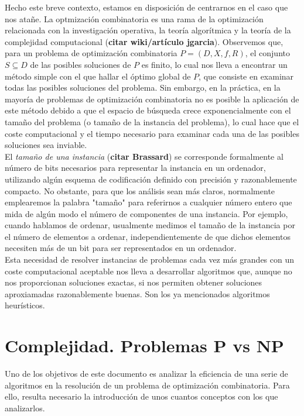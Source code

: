 \documentclass[a4paper, 12pt, oneside]{book}
\begin{document}
	Hecho este breve contexto, estamos en disposici\'on de centrarnos en el caso que nos ata\~{n}e. La optmizaci\'on combinatoria es una rama de la optimizaci\'on relacionada con la investigaci\'on operativa, la teor\'ia algor\'itmica y la teor\'ia de la complejidad computacional (\textbf{citar wiki/art\'iculo jgarcia}). Observemos que, para un problema de optimizaci\'on combinatoria $P = (D, X, f, R)$, el conjunto $S\subseteq D$ de las posibles soluciones de $P$ es finito, lo cual nos lleva a encontrar un m\'etodo simple con el que hallar el \'optimo global de $P$, que consiste en examinar todas las posibles soluciones del problema. Sin embargo, en la pr\'actica, en la mayor\'ia de problemas de optimizaci\'on combinatoria no es posible la aplicaci\'on de este m\'etodo debido a que el espacio de b\'usqueda crece exponencialmente con el tama\~{n}o del problema (o tama\~{n}o de la instancia del problema), lo cual hace que el coste computacional y el tiempo necesario para examinar cada una de las posibles soluciones sea inviable.
	\\
	
	El \textit{tama\~{n}o de una instancia} (\textbf{citar Brassard}) se corresponde formalmente al n\'umero de bits necesarios para representar la instancia en un ordenador, utilizando alg\'un esquema de codificaci\'on definido con precisi\'on y razonablemente compacto. No obstante, para que los an\'alisis sean m\'as claros, normalmente emplearemos la palabra "tama\~{n}o" para referirnos a cualquier n\'umero entero que mida de alg\'un modo el n\'umero de componentes de una instancia. Por ejemplo, cuando hablamos de ordenar, usualmente medimos el tama\~{n}o de la instancia por el n\'umero de elementos a ordenar, independientemente de que dichos elementos necesiten m\'as de un bit para ser representados en un ordenador.
	\\
	
	Esta necesidad de resolver instancias de problemas cada vez m\'as grandes con un coste computacional aceptable nos lleva a desarrollar algoritmos que, aunque no nos proporcionan soluciones exactas, si nos permiten obtener soluciones aproxiamadas razonablemente buenas. Son los ya mencionados algoritmos heur\'isticos.
	
	\section{Complejidad. Problemas P vs NP}
	
	Uno de los objetivos de este documento es analizar la eficiencia de una serie de algoritmos en la resoluci\'on de un problema de optimizaci\'on combinatoria. Para ello, resulta necesario la introducci\'on de unos cuantos conceptos con los que analizarlos.
	\\
	
\end{document}
